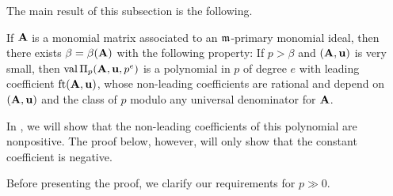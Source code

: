 \documentclass{amsart}
\begin{document}
The main result of this subsection is the following.

\begin{theorem}
   \label{m-primary AIP: T}
   If $\mathbf{A}$ is a monomial matrix associated to an $\mathfrak{m}$-primary monomial ideal, then there exists $\beta=\beta(\mathbf{A})$ with the following property\textup:
   If $p > \beta$ and $(\mathbf{A},\mathbf{u})$ is very small, then $\operatorname{val} \Pi_p(\mathbf{A},\mathbf{u},p^e)$ is a polynomial in $p$ of degree $e$ with leading coefficient $\operatorname{ft}(\mathbf{A}, \mathbf{u})$, whose non-leading coefficients are rational and depend on $(\mathbf{A},\mathbf{u})$ and the class of $p$ modulo any universal denominator for $\mathbf{A}$.
\end{theorem}

\begin{remark}
   In , we will show that the non-leading coefficients of this polynomial are nonpositive.
   The proof below, however, will only show that the constant coefficient is negative.
\end{remark}

Before presenting the proof, we clarify our requirements for $p\gg 0$.
\end{document}

